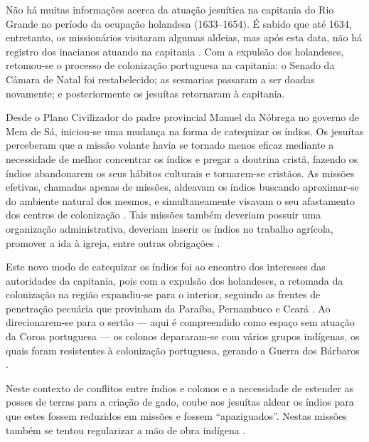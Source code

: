 Não há muitas informações acerca da atuação jesuítica na capitania do Rio Grande no período da ocupação holandesa (1633--1654). É sabido que até 1634, entretanto, os missionários visitaram algumas aldeias, mas após esta data, não há registro dos inacianos atuando na capitania \cite[p.~91]{Porto2000}. Com a expulsão dos holandeses, retomou-se o processo de colonização portuguesa na capitania: o Senado da Câmara de Natal foi restabelecido; as sesmarias passaram a ser doadas novamente; e posteriormente os jesuítas retornaram à capitania.  

Desde o Plano Civilizador do padre provincial Manuel da Nóbrega no governo de Mem de Sá, iniciou-se uma mudança na forma de catequizar os índios. Os jesuítas perceberam que a missão volante havia se tornado menos eficaz mediante a necessidade de melhor concentrar os índios e pregar a doutrina cristã, fazendo os índios abandonarem os seus hábitos culturais e tornarem-se cristãos. As missões efetivas, chamadas apenas de missões, aldeavam os índios buscando aproximar-se do ambiente natural dos mesmos, e simultaneamente visavam o seu afastamento dos centros de colonização \cite{Azevedo1959}. Tais missões também deveriam possuir uma organização administrativa, deveriam inserir os índios no trabalho agrícola, promover a ida à igreja, entre outras obrigações \cite[p.~162]{Lopes2003}. 

Este novo modo de catequizar os índios foi ao encontro dos interesses das autoridades da capitania, pois com a expulsão dos holandeses, a retomada da colonização na região expandiu-se para o interior, seguindo as frentes de penetração pecuária que provinham da Paraíba, Pernambuco e Ceará \cite[p.~129]{Lopes2003}. Ao direcionarem-se para o sertão --- aqui é compreendido como espaço sem atuação da Coroa portuguesa \cite[p.~112]{Silva2010} --- os colonos depararam-se com vários grupos indígenas, os quais foram resistentes à colonização portuguesa, gerando a Guerra dos Bárbaros \cites[p.~96]{Cascudo1984}{Dias2015}{Silva2015}.  

Neste contexto de conflitos entre índios e colonos e a necessidade de estender as posses de terras para a criação de gado, coube aos jesuítas aldear os índios para que estes fossem reduzidos em missões e fossem “apaziguados”. Nestas missões também se tentou regularizar a mão de obra indígena \cite[p.~95]{Porto2000}. 

